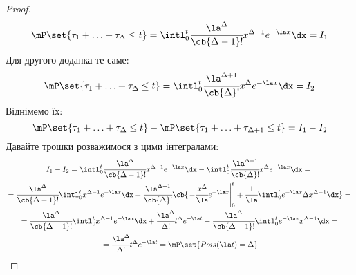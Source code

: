 \begin{proof}
	\begin{equation}
		\mP\set{\tau_1+\ldots+\tau_\Delta\leq t} = \intl_0^t \cfrac{\la^\Delta}{\cb{\Delta-1}!} x^{\Delta-1} e^{-\la x} \dx = I_1
	\end{equation}
	Для другого доданка те саме:
	\begin{equation}
		\mP\set{\tau_1+\ldots+\tau_\Delta\leq t} = \intl_0^t \cfrac{\la^{\Delta+1}}{\cb{\Delta}!} x^{\Delta} e^{-\la x} \dx = I_2
	\end{equation}
	Віднімемо їх:
	\begin{equation}
		\mP\set{\tau_1 + \ldots + \tau_\Delta\leq t} - \mP\set{\tau_1 + \ldots + \tau_{\Delta+1}\leq t} = I_1 - I_2
	\end{equation}
	Давайте трошки розважимося з цими інтегралами:
	\begin{multline}
		I_1 - I_2 = \intl_0^t \cfrac{\la^\Delta}{\cb{\Delta-1}!} x^{\Delta-1} e^{-\la x} \dx -  \intl_0^t \cfrac{\la^{\Delta+1}}{\cb{\Delta}!} x^{\Delta} e^{-\la x} \dx ={}\\{}=  \cfrac{\la^\Delta}{\cb{\Delta-1}!} \intl_0^t x^{\Delta-1} e^{-\la x} \dx - \cfrac{\la^{\Delta+1}}{\cb{\Delta}!} \cb{ \left. -\cfrac{x^\Delta}{\la} e^{-\la x} \right|_0^t + \cfrac1\la \intl_0^t e^{-\la x} \Delta x^{\Delta-1} \dx}	 = {} \\ {} = \cfrac{\la^\Delta}{\cb{\Delta-1}!} \intl_0^t x^{\Delta-1} e^{-\la x} \dx +\cfrac{\la^\Delta}{\Delta!} t^\Delta e^{-\la t} - \cfrac{\la^\Delta}{\cb{\Delta-1}!} \intl_0^t e^{-\la x} x^{\Delta-1} \dx = {} \\ {} =  \cfrac{\la^\Delta}{\Delta!} t^\Delta e^{-\la t} = \mP\set{Pois(\la t) = \Delta}
	\end{multline}
\end{proof}
